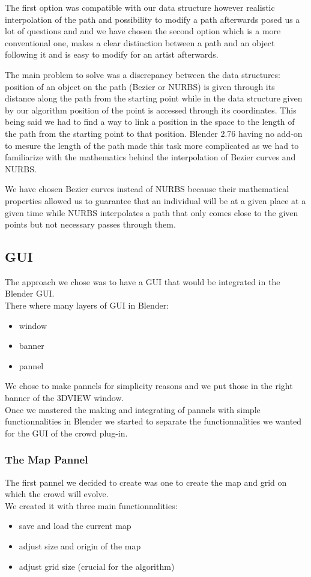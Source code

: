 The first option was compatible with our data structure however realistic interpolation of the path and possibility to modify a path afterwards posed us a lot of questions and and we have chosen the second option which is a more conventional one, makes a clear distinction between a path and an object following it and is easy to modify for an artist afterwards. 

The main problem to solve was a discrepancy between the data structures: position of an object on the path (Bezier or NURBS) is given through its distance along the path from the starting point while in the data structure given by our algorithm position of the point is accessed through its coordinates. This being said we had to find a way to link a position in the space to the length of the path from the starting point to that position. Blender 2.76 having no add-on to mesure the length of the path made this task more complicated as we had to familiarize with the mathematics behind the interpolation of Bezier curves and NURBS.   

We have chosen Bezier curves instead of NURBS because their mathematical properties allowed us to guarantee that an individual will be at a given place at a given time while NURBS interpolates a path that only comes close to the given points but not necessary passes through them.

\subsection{GUI}
The approach we chose was to have a GUI that would be integrated in the Blender GUI.\\
There where many layers of GUI in Blender:
\begin{itemize}
\item window
\item banner
\item pannel
\end{itemize}

We chose to make pannels for simplicity reasons and we put those in the right banner of the 3DVIEW window.\\
Once we mastered the making and integrating of pannels with simple functionnalities in Blender we started to separate the functionnalities we wanted for the GUI of the crowd plug-in.

\subsubsection{The Map Pannel}
The first pannel we decided to create was one to create the map and grid on which the crowd will evolve.\\
We created it with three main functionnalities:
\begin{itemize}
\item save and load the current map
\item adjust size and origin of the map
\item adjust grid size (crucial for the algorithm)
\end{itemize}


